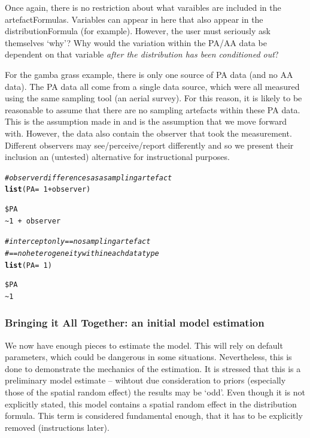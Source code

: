 \documentclass[article,shortnames,nojss]{jss}\usepackage[]{graphicx}\usepackage[]{xcolor}
\makeatletter
\newcommand{\hlnum}[1]{\textcolor[rgb]{0.686,0.059,0.569}{#1}}%
\newcommand{\hlcom}[1]{\textcolor[rgb]{0.678,0.584,0.686}{\textit{#1}}}%
\newcommand{\hlopt}[1]{\textcolor[rgb]{0,0,0}{#1}}%
\newcommand{\hlstd}[1]{\textcolor[rgb]{0.345,0.345,0.345}{#1}}%
\newcommand{\hlkwc}[1]{\textcolor[rgb]{0.333,0.667,0.333}{#1}}%
\newcommand{\hlkwd}[1]{\textcolor[rgb]{0.737,0.353,0.396}{\textbf{#1}}}%
\newenvironment{kframe}{%
 \def\at@end@of@kframe{}%
 \ifinner\ifhmode%
  \def\at@end@of@kframe{\end{minipage}}%
  \begin{minipage}{\columnwidth}%
 \fi\fi%
 \def\FrameCommand##1{\hskip\@totalleftmargin \hskip-\fboxsep
 \colorbox{shadecolor}{##1}\hskip-\fboxsep
     \hskip-\linewidth \hskip-\@totalleftmargin \hskip\columnwidth}%
 \MakeFramed {\advance\hsize-\width
   \@totalleftmargin\z@ \linewidth\hsize
   \@setminipage}}%
 {\par\unskip\endMakeFramed%
 \at@end@of@kframe}
\newenvironment{knitrout}{}{} %
\makeatother
\begin{document}
Once again, there is no restriction about what varaibles are included in the artefactFormulas. Variables can appear in here that also appear in the distributionFormula (for example). However, the user must seriously ask themselves `why'? Why would the variation within the PA/AA data be dependent on that variable \textit{after the distribution has been conditioned out}?
    
For the gamba grass example, there is only one source of PA data (and no AA data). The PA data all come from a single data source, which were all measured using the same sampling tool (an aerial survey). For this reason, it is likely to be reasonable to assume that there are no sampling artefacts within these PA data. This is the assumption made in \citet{fos24} and is the assumption that we move forward with. However, the data also contain the observer that took the measurement. Different observers may see/perceive/report differently and so we present their inclusion an (untested) alternative for instructional purposes.
\begin{knitrout}
\color{fgcolor}\begin{kframe}
\begin{alltt}
\hlcom{#observer differences as a sampling artefact}
\hlkwd{list}\hlstd{(} \hlkwc{PA}\hlstd{=}\hlopt{~}\hlnum{1}\hlopt{+}\hlstd{observer)}
\end{alltt}
\begin{verbatim}
$PA
~1 + observer
\end{verbatim}
\begin{alltt}
\hlcom{#intercept only == no sampling artefact }
\hlcom{#               == no heterogeneity within each data type}
\hlkwd{list}\hlstd{(} \hlkwc{PA}\hlstd{=}\hlopt{~}\hlnum{1}\hlstd{)}
\end{alltt}
\begin{verbatim}
$PA
~1
\end{verbatim}
\end{kframe}
\end{knitrout}
    
\subsubsection*{Bringing it All Together: an initial model estimation}
  
We now have enough pieces to estimate the model. This will rely on default parameters, which could be dangerous in some situations. Nevertheless, this is done to demonstrate the mechanics of the estimation. It is stressed that this is a preliminary model estimate -- wihtout due consideration to priors (especially those of the spatial random effect) the results may be `odd'. Even though it is not explicitly stated, this model contains a spatial random effect in the distribution formula. This term is considered fundamental enough, that it has to be explicitly removed (instructions later).
\end{document}
